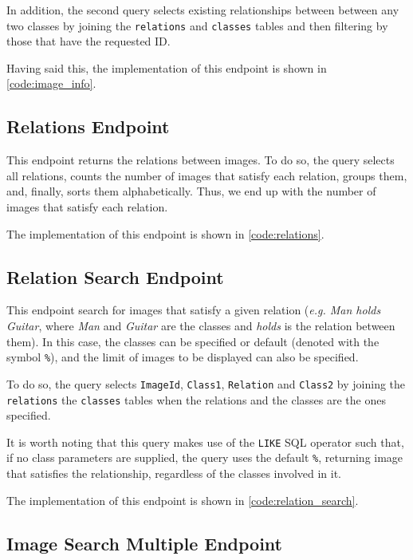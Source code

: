 \documentclass[a4paper, 11pt]{article}
\begin{document}
In addition, the second query selects existing relationships between between any two classes by 
joining the \texttt{relations} and \texttt{classes} tables and then filtering by those that have 
the requested ID.

Having said this, the implementation of this endpoint is shown in \cref{code:image_info}.

\subsection{Relations Endpoint}

This endpoint returns the relations between images. To do so, the query selects all relations, 
counts the number of images that satisfy each relation, groups them, and, finally, sorts them 
alphabetically. Thus, we end up with the number of images that satisfy each relation.

The implementation of this endpoint is shown in \cref{code:relations}.

\subsection{Relation Search Endpoint}

This endpoint search for images that satisfy a given relation (\textit{e.g. Man holds Guitar}, 
where \textit{Man} and \textit{Guitar} are the classes and \textit{holds} is the relation between 
them). In this case, the classes can be specified or default (denoted with the symbol \texttt{\%}), 
and the limit of images to be displayed can also be specified.

To do so, the query selects \texttt{ImageId}, \texttt{Class1}, \texttt{Relation} and 
\texttt{Class2} by joining the \texttt{relations} the \texttt{classes} tables when the relations 
and the classes are the ones specified.

It is worth noting that this query makes use of the \texttt{LIKE} SQL operator such that, if no 
class parameters are supplied, the query uses the default \texttt{\%}, returning image that 
satisfies the relationship, regardless of the classes involved in it.

The implementation of this endpoint is shown in \cref{code:relation_search}.

\subsection{Image Search Multiple Endpoint}
\end{document}

